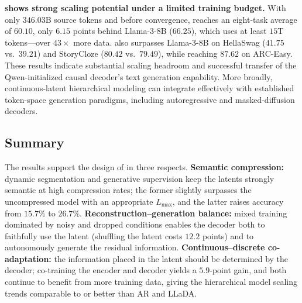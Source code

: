 \textbf{\obs{} \method shows strong scaling potential under a limited training budget.} With only $346.03$B source tokens and before convergence, \method reaches an eight-task average of $60.10$, only $6.15$ points behind Llama-3-8B ($66.25$), which uses at least $15$T tokens---over $43{\times}$ more data. \method also surpasses Llama-3-8B on HellaSwag ($41.75$ vs.\ $39.21$) and StoryCloze ($80.42$ vs.\ $79.49$), while reaching $87.62$ on ARC-Easy. These results indicate substantial scaling headroom and successful transfer of the Qwen-initialized causal decoder's text generation capability. More broadly, continuous-latent hierarchical modeling can integrate effectively with established token-space generation paradigms, including autoregressive and masked-diffusion decoders.

\subsection{Summary}

The results support the design of \method in three respects. \textbf{Semantic compression:} dynamic segmentation and generative supervision keep the latents strongly semantic at high compression rates; the former slightly surpasses the uncompressed model with an appropriate $L_{\max}$, and the latter raises accuracy from $15.7\%$ to $26.7\%$. \textbf{Reconstruction--generation balance:} mixed training dominated by noisy and dropped conditions enables the decoder both to faithfully use the latent (shuffling the latent costs $12.2$ points) and to autonomously generate the residual information. \textbf{Continuous--discrete co-adaptation:} the information placed in the latent should be determined by the decoder; co-training the encoder and decoder yields a $5.9$-point gain, and both continue to benefit from more training data, giving the hierarchical model scaling trends comparable to or better than AR and LLaDA.

\FloatBarrier
\endgroup
